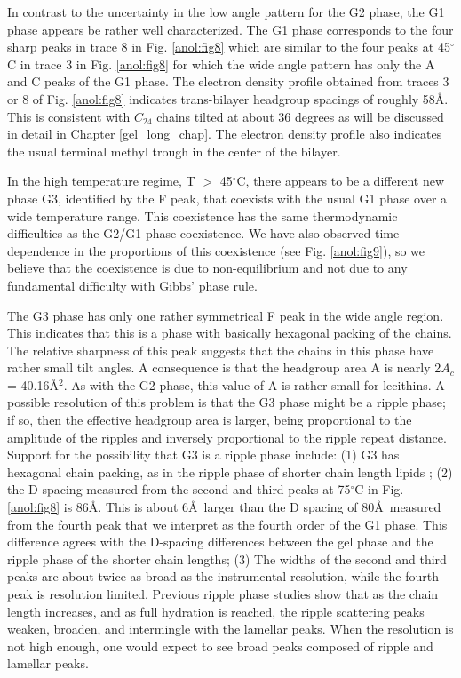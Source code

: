 In contrast to the uncertainty in the low angle pattern for the G2 phase, the
G1 phase appears be rather well characterized.  The G1 phase
corresponds to the four sharp peaks in trace 8 in
Fig. \ref{anol:fig8} which are similar to the four peaks at 45$^{\circ}$C in trace 3 in Fig. \ref{anol:fig8}
for which the wide angle pattern has only the A and C peaks of the
G1 phase.  The electron density profile obtained from traces 3 or 8
of Fig. \ref{anol:fig8} indicates trans-bilayer headgroup spacings of roughly
58\AA.  This is consistent with $C_{24}$ chains tilted at about 36 degrees
as will be discussed in detail in Chapter \ref{gel_long_chap}.
The electron density profile also indicates the usual terminal methyl trough in the 
center of the bilayer.

In the high temperature regime, T $>$ 45$^{\circ }$C, there appears to be a 
different new phase G3, identified by the F peak, that coexists with the usual 
G1 phase over a wide temperature range.  This coexistence has the same
thermodynamic difficulties as the G2/G1 phase coexistence.
We have also observed time dependence in the proportions of this coexistence
(see Fig. \ref{anol:fig9}), so we believe that the coexistence is due to non-equilibrium and
not due to any fundamental difficulty with Gibbs' phase rule.

The G3 phase has only one rather symmetrical F peak in
the wide angle region.  This indicates that this
is a phase with basically hexagonal packing of the chains.
The relative sharpness of this peak suggests that the chains in this
phase have rather small tilt angles.  A consequence is that the
headgroup area A is nearly 2$A_c$ = 40.16\AA$^2$.  As with the G2 phase,
this value of A is rather small for lecithins.  A possible 
resolution of this problem is that the G3 phase might be a
ripple phase; if so, then the effective headgroup area is larger, being
proportional to the amplitude of the ripples and inversely
proportional to the ripple repeat distance.  
Support for the possibility that G3 is a ripple phase include: 
(1) G3 has hexagonal chain packing, as in the ripple phase of shorter chain 
length lipids \cite{HenRus91};
(2) the D-spacing measured from the second and third peaks at 75$^{\circ}$C
in Fig. \ref{anol:fig8} is 86\AA.  This is about 6\AA\ larger than the D spacing of 80\AA\ 
measured from the fourth peak that we interpret as the fourth order of the
G1 phase.  This difference agrees with the D-spacing differences between 
the gel phase and the ripple phase of the shorter chain lengths; 
(3) The widths of the second and third peaks are about twice as broad as the
instrumental resolution, while the fourth peak is resolution limited.  Previous
ripple phase studies \cite{Wac89a} show that as the chain length increases,
and as full hydration is reached, the ripple scattering peaks weaken,
broaden, and intermingle with the lamellar peaks. When the resolution is
not high enough, one would expect to see broad peaks composed of ripple and lamellar peaks.

